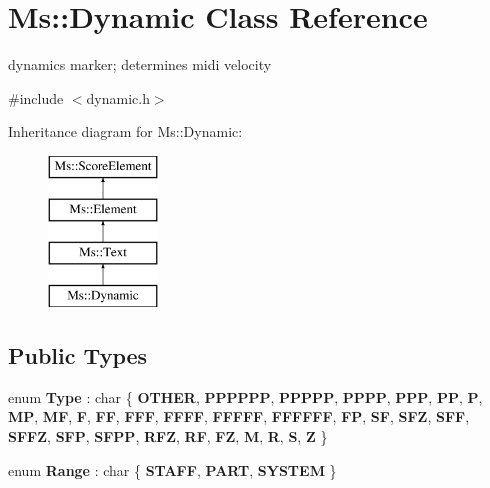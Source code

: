 \hypertarget{class_ms_1_1_dynamic}{}\section{Ms\+:\+:Dynamic Class Reference}
\label{class_ms_1_1_dynamic}


dynamics marker; determines midi velocity  




{\ttfamily \#include $<$dynamic.\+h$>$}

Inheritance diagram for Ms\+:\+:Dynamic\+:\begin{figure}[H]
\begin{center}
\leavevmode
\includegraphics[height=4.000000cm]{class_ms_1_1_dynamic}
\end{center}
\end{figure}
\subsection*{Public Types}
\begin{DoxyCompactItemize}
\item 
\mbox{\label{class_ms_1_1_dynamic_a6c02472e11041debb32b75084b10bd27}} 
enum {\bfseries Type} \+: char \{ \newline
{\bfseries O\+T\+H\+ER}, 
{\bfseries P\+P\+P\+P\+PP}, 
{\bfseries P\+P\+P\+PP}, 
{\bfseries P\+P\+PP}, 
\newline
{\bfseries P\+PP}, 
{\bfseries PP}, 
{\bfseries P}, 
{\bfseries MP}, 
\newline
{\bfseries MF}, 
{\bfseries F}, 
{\bfseries FF}, 
{\bfseries F\+FF}, 
\newline
{\bfseries F\+F\+FF}, 
{\bfseries F\+F\+F\+FF}, 
{\bfseries F\+F\+F\+F\+FF}, 
{\bfseries FP}, 
\newline
{\bfseries SF}, 
{\bfseries S\+FZ}, 
{\bfseries S\+FF}, 
{\bfseries S\+F\+FZ}, 
\newline
{\bfseries S\+FP}, 
{\bfseries S\+F\+PP}, 
{\bfseries R\+FZ}, 
{\bfseries RF}, 
\newline
{\bfseries FZ}, 
{\bfseries M}, 
{\bfseries R}, 
{\bfseries S}, 
\newline
{\bfseries Z}
 \}
\item 
\mbox{\label{class_ms_1_1_dynamic_a761adc6de93fec79a2bdbe26cbbb681a}} 
enum {\bfseries Range} \+: char \{ {\bfseries S\+T\+A\+FF}, 
{\bfseries P\+A\+RT}, 
{\bfseries S\+Y\+S\+T\+EM}
 \}
\end{DoxyCompactItemize}
